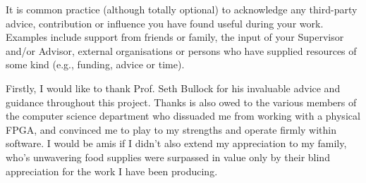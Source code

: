 \noindent
{
	\color{red}
It is common practice (although totally optional) to acknowledge any
third-party advice, contribution or influence you have found useful
during your work.  Examples include support from friends or family, 
the input of your Supervisor and/or Advisor, external organisations 
or persons who  have supplied resources of some kind (e.g., funding, 
advice or time).
}

Firstly, I would like to thank Prof. Seth Bullock for his invaluable
advice and guidance throughout this project.
Thanks is also owed to the various members of the computer science department
who dissuaded me from working with a physical FPGA, and convinced me to play to my strengths
and operate firmly within software. I would be amis if I didn't also extend
my appreciation to my family, who's unwavering food supplies were surpassed in value only by
their blind appreciation for the work I have been producing.
